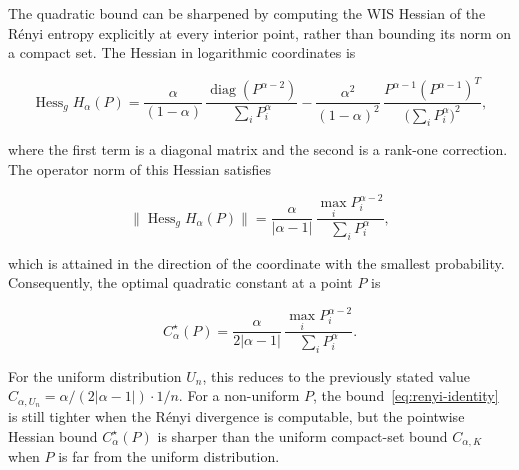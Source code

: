 \begin{remark}
\label{rem:improved-hessian}

The quadratic bound can be sharpened by computing the WIS Hessian of the
R\'enyi entropy explicitly at every interior point, rather than
bounding its norm on a compact set.  The Hessian in logarithmic
coordinates is

\[
\operatorname{Hess}_g H_\alpha(P)
=
\frac{\alpha}{(1-\alpha)}
\,
\frac{
\operatorname{diag}(P^{\alpha-2})
}{
\sum_i P_i^{\alpha}
}
-
\frac{\alpha^2}{(1-\alpha)^2}
\,
\frac{
P^{\alpha-1}(P^{\alpha-1})^T
}{
\bigl(\sum_i P_i^{\alpha}\bigr)^2
},
\]

where the first term is a diagonal matrix and the second is a rank-one
correction.  The operator norm of this Hessian satisfies

\[
\|\operatorname{Hess}_g H_\alpha(P)\|
=
\frac{\alpha}{|\alpha-1|}
\,
\frac{
\max_i P_i^{\alpha-2}
}{
\sum_i P_i^{\alpha}
},
\]

which is attained in the direction of the coordinate with the smallest
probability.  Consequently, the optimal quadratic constant at a point
\(P\) is

\[
C_\alpha^{\star}(P)
=
\frac{\alpha}{2|\alpha-1|}
\,
\frac{
\max_i P_i^{\alpha-2}
}{
\sum_i P_i^{\alpha}
}.
\]

For the uniform distribution \(U_n\), this reduces to the previously
stated value \(C_{\alpha,U_n}=\alpha/(2|\alpha-1|)\cdot 1/n\).  For a
non-uniform \(P\), the bound~\eqref{eq:renyi-identity} is still tighter when the
R\'enyi divergence is computable, but the pointwise Hessian bound
\(C_\alpha^{\star}(P)\) is sharper than the uniform compact-set bound
\(C_{\alpha,K}\) when \(P\) is far from the uniform distribution.
\end{remark}

